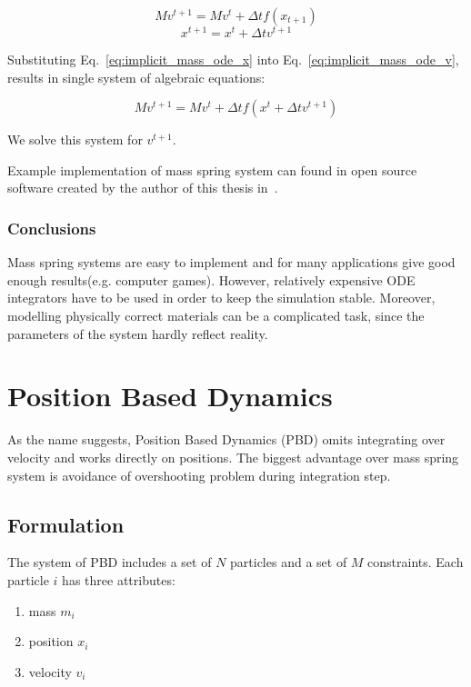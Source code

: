 \documentclass[en]{minipw} %
\begin{document}
\begin{equation}
\label{eq:implicit_mass_ode_v}
M v^{t+1} = M v^{t} + \Delta t f(x_{t+1})
\end{equation}
\begin{equation}
\label{eq:implicit_mass_ode_x}
x^{t+1} = x^{t} + \Delta t v^{t+1}
\end{equation}

Substituting Eq.~\ref{eq:implicit_mass_ode_x} into Eq.~\ref{eq:implicit_mass_ode_v}, results in single system of algebraic equations:

\begin{equation}
M v^{t+1} = M v^{t} + \Delta t f(x^{t} + \Delta t v^{t+1})
\end{equation}

We solve this system for $v^{t+1}$.

Example implementation of mass spring system can found in open source software created by the author of this thesis in~\cite{JC-MassSpring}. 

\subsubsection{Conclusions}
Mass spring systems are easy to implement and for many applications give good enough results(e.g. computer games). However, relatively expensive ODE integrators have to be used in order to keep the simulation stable. Moreover, modelling physically correct materials can be a complicated task, since the parameters of the system hardly reflect reality.

\section{Position Based Dynamics}
As the name suggests, Position Based Dynamics (PBD) omits integrating over velocity and works directly on positions. The biggest advantage over mass spring system is avoidance of overshooting problem during integration step.
\subsection{Formulation}
The system of PBD includes a set of $N$ particles and a set of $M$ constraints. Each particle $i$ has three attributes: 
\begin{enumerate}
\item mass $m_i$
\item position $x_i$
\item velocity $v_i$
\end{enumerate}
\end{document}
